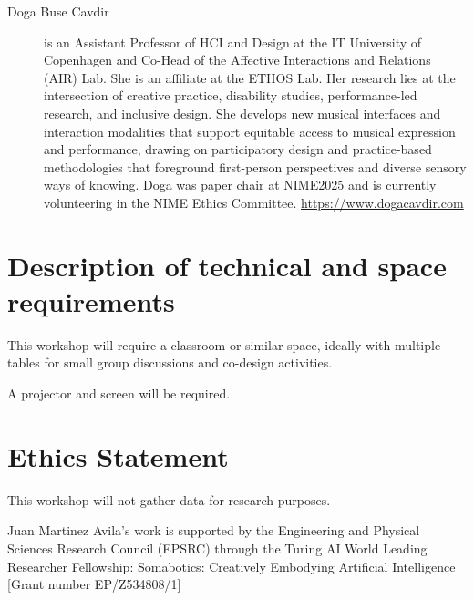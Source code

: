 \documentclass[acmsmall]{nimeart}
\begin{document}
\begin{description}
\item[Doga Buse Cavdir] is an Assistant Professor of HCI and Design at the IT University of Copenhagen and Co-Head of the Affective Interactions and Relations (AIR) Lab. She is an affiliate at the ETHOS Lab. Her research lies at the intersection of creative practice, disability studies, performance-led research, and inclusive design. She develops new musical interfaces and interaction modalities that support equitable access to musical expression and performance, drawing on participatory design and practice-based methodologies that foreground first-person perspectives and diverse sensory ways of knowing. Doga was paper chair at NIME2025 and is currently volunteering in the NIME Ethics Committee. \url{https://www.dogacavdir.com}

\end{description}

\section{Description of technical and space requirements}

This workshop will require a classroom or similar space, ideally with multiple tables for small group discussions and co-design activities.

A projector and screen will be required.

\section{Ethics Statement}

This workshop will not gather data for research purposes.

% 
% 

\begin{acks}
Juan Martinez Avila's work is supported by the Engineering and Physical Sciences Research Council (EPSRC) through the Turing AI World Leading Researcher Fellowship: Somabotics: Creatively Embodying Artificial Intelligence [Grant number EP/Z534808/1]
\end{acks}
\end{document}
